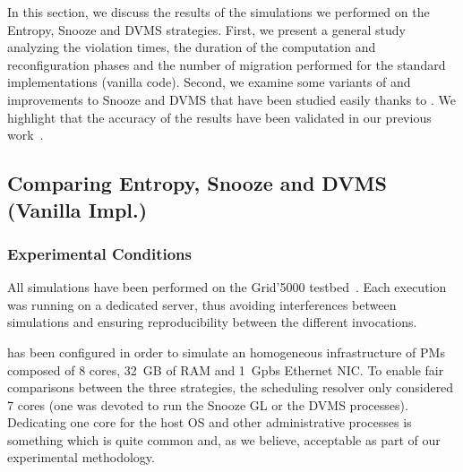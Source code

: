 

In this section, we discuss the results of the simulations we
performed on the Entropy, Snooze and DVMS strategies. First, we
present a general study analyzing the violation times, the duration of
the computation and reconfiguration phases and the number of migration
performed for the standard implementations (\aka vanilla code).
Second, we examine some variants of and improvements to Snooze and
DVMS that have been studied easily thanks to \vmps. We highlight that
the accuracy of the results have been validated in our previous
work~\cite{vmplaces:europar15}.

 \subsection{Comparing Entropy, Snooze and DVMS (Vanilla Impl.)}
%
\subsubsection{Experimental Conditions}

All simulations have been performed on the %
Grid'5000 testbed~\cite{grid5000}.  Each execution was running on a
dedicated server, thus avoiding interferences between simulations and
ensuring reproducibility between the different invocations.



\vmps has been configured in order to simulate an homogeneous
infrastructure of PMs composed of 8 cores, 32~GB of RAM and 1~Gpbs
Ethernet NIC. To enable fair comparisons between the three strategies,
the scheduling resolver only considered 7 cores (\ie one was devoted
to run the Snooze GL or the DVMS processes). Dedicating one core for
the host OS and other administrative processes is something which is
quite common and, as we believe, acceptable as part of our
experimental methodology.

